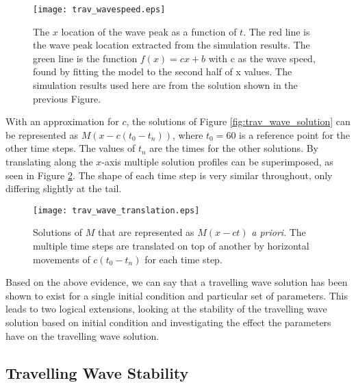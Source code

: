 \begin{figure}[!htp]
  \centering
    \texttt{[image: trav\_wavespeed.eps]}
    \caption{The $x$ location of the wave peak as a function of $t$.
      The red line is the wave peak location extracted from the simulation results.
      The green line is the function $f(x) = cx + b$ with c as the wave speed, found by fitting the model to the second half of x values.
      The simulation results used here are from the solution shown in the previous Figure.
    }
    \label{fig:trav_waveSpeed} 
\end{figure}

With an approximation for $c$, the solutions of Figure \ref{fig:trav_wave_solution} can be represented as $M(x - c (t_0 - t_{n}))$, where $t_0 = 60$ is a reference point for the other time steps.
The values of $t_{n}$ are the times for the other solutions.
By translating along the $x$-axis multiple solution profiles can be superimposed, as seen in Figure \ref{fig:trav_wave_translation}.
The shape of each time step is very similar throughout, only differing slightly at the tail.

\begin{figure}[!htp]
  \centering
    \texttt{[image: trav\_wave\_translation.eps]}
    \caption{Solutions of $M$ that are represented as $M(x -ct)$ \textit{a priori}.
      The multiple time steps are translated on top of another by horizontal movements of $c (t_0 - t_n)$ for each time step.
      }
    \label{fig:trav_wave_translation}
\end{figure}

Based on the above evidence, we can say that a travelling wave solution has been shown to exist for a single initial condition and particular set of parameters.
This leads to two logical extensions, looking at the stability of the travelling wave solution based on initial condition and investigating the effect the parameters have on the travelling wave solution.

\subsection{Travelling Wave Stability}


